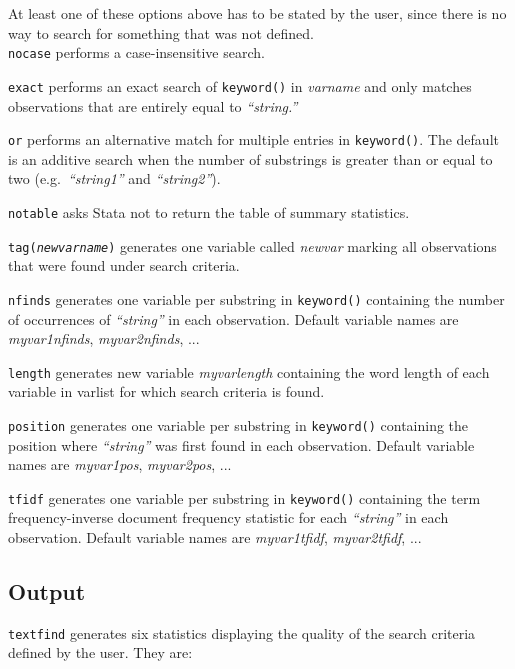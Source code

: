 \noindent At least one of these options above has to be stated by the user, since there is no way to search for something that was not defined. \\

\hangpara
{\tt nocase} performs a case-insensitive search.

\hangpara
{\tt exact} performs an exact search of {\tt keyword()} in {\it varname} and only matches observations that are entirely equal to {\it ``string.''}

\hangpara
{\tt or} performs an alternative match for multiple entries in {\tt keyword()}. The default is an additive search when the number of substrings is greater than or equal to two (e.g.~{\it ``string1''} and {\it ``string2''}).

\hangpara
{\tt notable} asks Stata not to return the table of summary statistics.

\hangpara
{\tt tag({\it newvarname})} generates one variable called {\it newvar} marking all observations that were found under search criteria.

\hangpara
{\tt nfinds} generates one variable per substring in {\tt keyword()} containing the number of occurrences of {\it ``string''} in each observation. Default variable names are {\it myvar1{\textunderscore}nfinds}, {\it myvar2{\textunderscore}nfinds}, ...

\hangpara
{\tt length} generates new variable {\it myvar{\textunderscore}length} containing the word length of each variable in varlist for which search criteria is found.

\hangpara
{\tt position} generates one variable per substring in {\tt keyword()} containing the position where {\it ``string''} was first found in each observation. Default variable names are {\it myvar1{\textunderscore}pos}, {\it myvar2{\textunderscore}pos}, ...

\hangpara
{\tt tfidf} generates one variable per substring in {\tt keyword()} containing the term frequency-inverse document frequency statistic for each {\it ``string''} in each observation. Default variable names are {\it myvar1{\textunderscore}tfidf}, {\it myvar2{\textunderscore}tfidf}, ...

\subsection{Output}
{\tt textfind} generates six statistics displaying the quality of the search criteria defined by the user. They are:


